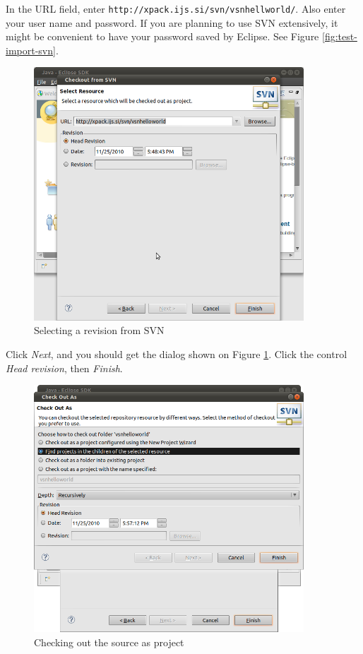 \documentclass[a4paper, 10pt]{article}
\begin{document}
In the URL field, enter
\verb+http://xpack.ijs.si/svn/vsnhellworld/+.
Also enter your user name and password.
If you are planning to use SVN extensively, it might be convenient to have your
password saved by Eclipse.
See Figure \ref{fig:test-import-svn}.

    \begin{figure}[H]
    \centering
        \includegraphics[width=0.9\textwidth]{./install-guide-linux-images/test-prj-head.png}
        \caption{Selecting a revision from SVN}
        \label{fig:test-prj-head}
    \end{figure}

Click \emph{Next}, and you should get the dialog shown on
Figure \ref{fig:test-prj-head}.
Click the control \emph{Head revision}, then \emph{Finish}.

    \begin{figure}[H]
    \centering
        \includegraphics[width=0.9\textwidth]{./install-guide-linux-images/test-checkout-as.png}
        \caption{Checking out the source as project}
        \label{fig:test-checkout-as}
    \end{figure}
\end{document}
